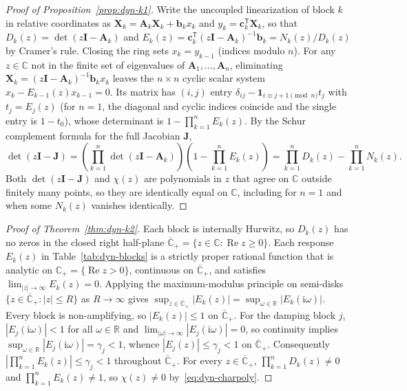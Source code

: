 \begin{proof}[Proof of Proposition~{\upshape\ref{prop:dyn-k1}}]
Write the uncoupled linearization of block $k$ in relative coordinates as $\dot{\mathbf{X}}_k = \mathbf{A}_k \mathbf{X}_k + \mathbf{b}_k x_k$ and $y_k = \mathbf{c}_k^{\mathsf{T}} \mathbf{X}_k$, so that $D_k(z) = \det(z\mathbf{I} - \mathbf{A}_k)$ and $E_k(z) = \mathbf{c}_k^{\mathsf{T}}(z\mathbf{I} - \mathbf{A}_k)^{-1}\mathbf{b}_k = N_k(z)/D_k(z)$ by Cramer's rule. Closing the ring sets $x_k = y_{k-1}$ (indices modulo $n$). For any $z \in \mathbb{C}$ not in the finite set of eigenvalues of $\mathbf{A}_1, \dots, \mathbf{A}_n$, eliminating $\mathbf{X}_k = (z\mathbf{I} - \mathbf{A}_k)^{-1}\mathbf{b}_k x_k$ leaves the $n \times n$ cyclic scalar system $x_k - E_{k-1}(z)x_{k-1} = 0$. Its matrix has $(i, j)$ entry $\delta_{ij} - \mathbf{1}_{i \equiv j + 1 \pmod n} t_j$ with $t_j = E_j(z)$ (for $n = 1$, the diagonal and cyclic indices coincide and the single entry is $1 - t_0$), whose determinant is $1 - \prod_{k=1}^n E_k(z)$. By the Schur complement formula for the full Jacobian $\mathbf{J}$,
\[
\det(z\mathbf{I} - \mathbf{J}) = \left(\prod_{k=1}^n \det(z\mathbf{I} - \mathbf{A}_k)\right)\left(1 - \prod_{k=1}^n E_k(z)\right) = \prod_{k=1}^n D_k(z) - \prod_{k=1}^n N_k(z).
\]
Both $\det(z\mathbf{I} - \mathbf{J})$ and $\chi(z)$ are polynomials in $z$ that agree on $\mathbb{C}$ outside finitely many points, so they are identically equal on $\mathbb{C}$, including for $n = 1$ and when some $N_k(z)$ vanishes identically.
\end{proof}

\begin{proof}[Proof of Theorem~{\upshape\ref{thm:dyn-k2}}]
Each block is internally Hurwitz, so $D_k(z)$ has no zeros in the closed right half-plane $\overline{\mathbb{C}}_+ = \{z \in \mathbb{C} : \operatorname{Re} z \ge 0\}$. Each response $E_k(z)$ in Table~\ref{tab:dyn-blocks} is a strictly proper rational function that is analytic on $\mathbb{C}_+ = \{\operatorname{Re} z > 0\}$, continuous on $\overline{\mathbb{C}}_+$, and satisfies $\lim_{|z| \to \infty} E_k(z) = 0$. Applying the maximum-modulus principle on semi-disks $\{z \in \overline{\mathbb{C}}_+ : |z| \le R\}$ as $R \to \infty$ gives $\sup_{z \in \overline{\mathbb{C}}_+} |E_k(z)| = \sup_{\omega \in \mathbb{R}} |E_k(\mathrm{i}\omega)|$. Every block is non-amplifying, so $|E_k(z)| \le 1$ on $\overline{\mathbb{C}}_+$. For the damping block $j$, $|E_j(\mathrm{i}\omega)| < 1$ for all $\omega \in \mathbb{R}$ and $\lim_{|\omega| \to \infty} |E_j(\mathrm{i}\omega)| = 0$, so continuity implies $\sup_{\omega \in \mathbb{R}} |E_j(\mathrm{i}\omega)| = \gamma_j < 1$, whence $|E_j(z)| \le \gamma_j < 1$ on $\overline{\mathbb{C}}_+$. Consequently $|\prod_{k=1}^n E_k(z)| \le \gamma_j < 1$ throughout $\overline{\mathbb{C}}_+$. For every $z \in \overline{\mathbb{C}}_+$, $\prod_{k=1}^n D_k(z) \ne 0$ and $\prod_{k=1}^n E_k(z) \ne 1$, so $\chi(z) \ne 0$ by~\eqref{eq:dyn-charpoly}.
\end{proof}

